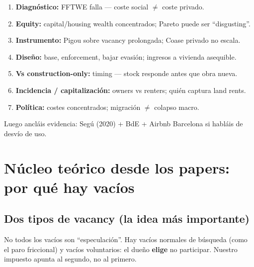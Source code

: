 \documentclass[11pt,a4paper]{report}
\begin{document}
\begin{enumerate}
  \item \textbf{Diagn\'ostico:} FFTWE falla --- coste social $\neq$ coste privado.
  \item \textbf{Equity:} capital/housing wealth concentrados; Pareto puede ser ``disgusting''.
  \item \textbf{Instrumento:} Pigou sobre vacancy prolongada; Coase privado no escala.
  \item \textbf{Dise\~no:} base, enforcement, bajar evasión; ingresos a vivienda asequible.
  \item \textbf{Vs construction-only:} timing --- stock responde antes que obra nueva.
  \item \textbf{Incidencia / capitalizaci\'on:} owners vs renters; qui\'en captura land rents.
  \item \textbf{Pol\'itica:} costes concentrados; migraci\'on $\neq$ colapso macro.
\end{enumerate}

Luego ancl\'ais evidencia: Seg\'u (2020) + BdE + Airbnb Barcelona si habl\'ais de desv\'io de uso.

\chapter{N\'ucleo te\'orico desde los papers: por qu\'e hay vac\'ios}
\label{ch:teoria-papers}

\section{Dos tipos de vacancy (la idea m\'as importante)}

\begin{intuicion}
No todos los vac\'ios son ``especulaci\'on''. Hay vac\'ios normales de b\'usqueda
(como el paro friccional) y vac\'ios voluntarios: el due\~no \textbf{elige}
no participar. Nuestro impuesto apunta al segundo, no al primero.
\end{intuicion}
\end{document}
